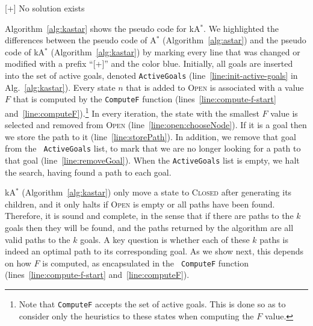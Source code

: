 \documentclass{aicom2e}
\newcommand{\astar}{A$^*$}
\newcommand{\kastar}{kA$^*$}
\newcommand{\newcode}[1]{{\color{blue}[+] #1}}
\newcommand{\open}{\textsc{Open}}
\newcommand{\closed}{\textsc{Closed}}
\newcommand{\roni}[1]{\textbf{[RS:#1]}}
\begin{document}
\begin{algorithm2e}[t!]
{{        }
    }
    \newcode{ \If{{\tt ActiveGoals} $= \emptyset$}{
        \newcode{\Return \textsc{Solution}}\\
    }}
    \Return No solution exists\\
    \caption{\kastar{}}
    \label{alg:kastar}
\end{algorithm2e}



Algorithm~\ref{alg:kastar} shows the pseudo code for \kastar{}.
We highlighted the differences between the pseudo code of \astar{} (Algorithm~\ref{alg:astar})
and the pseudo code of \kastar{} (Algorithm~\ref{alg:kastar})
by marking every line that was changed or modified with a prefix ``[+]'' and the color blue.
Initially, all goals are inserted into the set of active goals, denoted  {\tt ActiveGoals}
(line~\ref{line:init-active-goals} in Alg.~\ref{alg:kastar}). Every state
$n$ that is added to \open{} is associated with a value $F$ that is
computed by the {\tt ComputeF} function (lines~\ref{line:compute-f-start} and~\ref{line:computeF}).\footnote{Note that {\tt ComputeF} accepts the set of active goals. This is done so as to consider only the heuristics to these states when computing the $F$ value.} In every iteration, the state with
the smallest $F$ value is selected and removed from \open{}
(line~\ref{line:open:chooseNode}). If it is a goal then we store the path to it
(line~\ref{line:storePath}). In addition, we remove that goal from the {\tt
ActiveGoals} list, to mark that we are no longer looking for a path to that
goal (line~\ref{line:removeGoal}). When the {\tt ActiveGoals} list is empty, we
halt the search, having found a path to each goal.


\kastar{} (Algorithm~\ref{alg:kastar}) only move a state to \closed{} after
generating its children, and it only halts if \open{} is empty or all paths have been found. Therefore, it is sound and complete, in the sense that if there are paths to the $k$ goals then they will be found, and the paths returned by the algorithm are all valid paths to the $k$ goals. A key question is whether each of these $k$ paths is indeed
an optimal path to its corresponding goal.
As we show next, this depends on how $F$ is computed, as encapsulated in the {\tt
ComputeF} function (lines~\ref{line:compute-f-start} and~\ref{line:computeF}).

\end{document}
